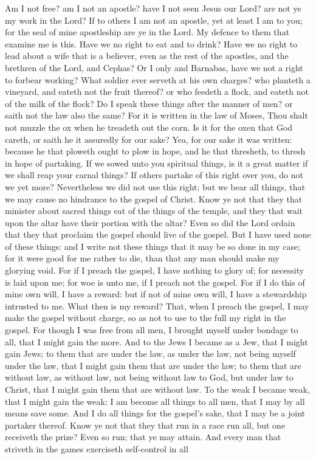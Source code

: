 Am I not free? am I not an apostle? have I not seen Jesus our Lord? are not ye my work in the Lord? If to others I am not an apostle, yet at least I am to you; for the seal of mine apostleship are ye in the Lord. My defence to them that examine me is this. Have we no right to eat and to drink? Have we no right to lead about a wife that is a believer, even as the rest of the apostles, and the brethren of the Lord, and Cephas? Or I only and Barnabas, have we not a right to forbear working? What soldier ever serveth at his own charges? who planteth a vineyard, and eateth not the fruit thereof? or who feedeth a flock, and eateth not of the milk of the flock? Do I speak these things after the manner of men? or saith not the law also the same? For it is written in the law of Moses, Thou shalt not muzzle the ox when he treadeth out the corn. Is it for the oxen that God careth, or saith he it assuredly for our sake? Yea, for our sake it was written: because he that ploweth ought to plow in hope, and he that thresheth, to thresh in hope of partaking. If we sowed unto you spiritual things, is it a great matter if we shall reap your carnal things? If others partake of this right over you, do not we yet more? Nevertheless we did not use this right; but we bear all things, that we may cause no hindrance to the gospel of Christ. Know ye not that they that minister about sacred things eat of the things of the temple, and they that wait upon the altar have their portion with the altar? Even so did the Lord ordain that they that proclaim the gospel should live of the gospel. But I have used none of these things: and I write not these things that it may be so done in my case; for it were good for me rather to die, than that any man should make my glorying void. For if I preach the gospel, I have nothing to glory of; for necessity is laid upon me; for woe is unto me, if I preach not the gospel. For if I do this of mine own will, I have a reward: but if not of mine own will, I have a stewardship intrusted to me. What then is my reward? That, when I preach the gospel, I may make the gospel without charge, so as not to use to the full my right in the gospel. For though I was free from all men, I brought myself under bondage to all, that I might gain the more. And to the Jews I became as a Jew, that I might gain Jews; to them that are under the law, as under the law, not being myself under the law, that I might gain them that are under the law; to them that are without law, as without law, not being without law to God, but under law to Christ, that I might gain them that are without law. To the weak I became weak, that I might gain the weak: I am become all things to all men, that I may by all means save some. And I do all things for the gospel’s sake, that I may be a joint partaker thereof. Know ye not that they that run in a race run all, but one receiveth the prize? Even so run; that ye may attain. And every man that striveth in the games exerciseth self-control in all 